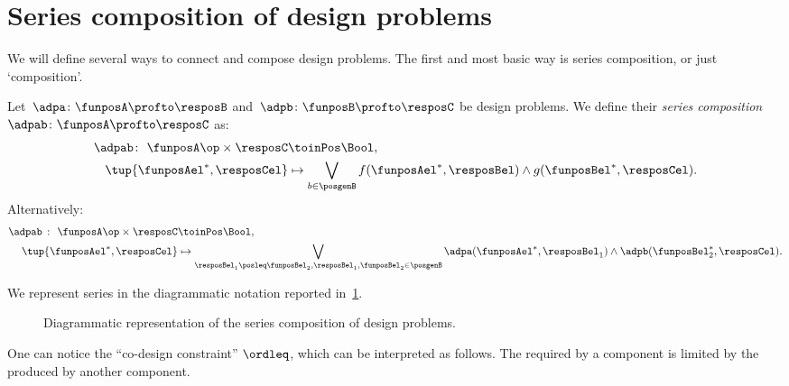 \section{Series composition of design problems}
We will define several ways to connect and compose design problems. The first and most basic way is series composition, or just `composition'.

\begin{definition}
  \label{def:dp-series}
  Let~$\adpa \colon  \funposA \profto \resposB$ and~$\adpb \colon \funposB \profto \resposC$ be design problems. We define their \emph{series composition}~$\adpab \colon  \funposA \profto \resposC$ as:
  \begin{equation}
    \label{eq:composition2}
    \begin{aligned}
    \adpab
      \colon \ \funposA\op \times \resposC & \toinPos  \Bool, \\
      \tup{\funposAel^*, \resposCel} &\mapsto \bigvee_{b\in \posgenB} f(\funposAel^*,\resposBel) \wedge g(\funposBel^*,\resposCel).
    \end{aligned}
  \end{equation}
  Alternatively:
  \begin{equation}
    \begin{aligned}
      \label{eq:composition}
      \adpab\  \colon \ \funposA\op \times \resposC & \toinPos  \Bool,  \\
      \tup{\funposAel^*, \resposCel} &\mapsto \bigvee_{\resposBel_1\posleq\funposBel_2, \resposBel_1,\funposBel_2\in \posgenB} \adpa(\funposAel^*,\resposBel_1) \wedge \adpb(\funposBel_2^*,\resposCel).
    \end{aligned}
  \end{equation}
\end{definition}
We represent series in the diagrammatic notation reported in~\cref{fig:compositiondiagram}.

\begin{figure}[h!]
  \begin{center}
  \end{center}
  \caption{Diagrammatic representation of the series composition of design problems. \label{fig:compositiondiagram}}
\end{figure}

One can notice the ``co-design constraint'' $\ordleq$, which can be interpreted as follows.
The  required by a component is limited by the  produced by another component.

